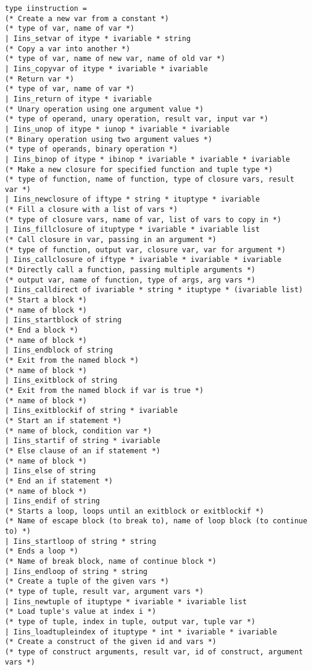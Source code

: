 \begin{verbatim}
type iinstruction =
(* Create a new var from a constant *)
(* type of var, name of var *)
| Iins_setvar of itype * ivariable * string
(* Copy a var into another *)
(* type of var, name of new var, name of old var *)
| Iins_copyvar of itype * ivariable * ivariable
(* Return var *)
(* type of var, name of var *)
| Iins_return of itype * ivariable
(* Unary operation using one argument value *)
(* type of operand, unary operation, result var, input var *)
| Iins_unop of itype * iunop * ivariable * ivariable
(* Binary operation using two argument values *)
(* type of operands, binary operation *)
| Iins_binop of itype * ibinop * ivariable * ivariable * ivariable
(* Make a new closure for specified function and tuple type *)
(* type of function, name of function, type of closure vars, result var *)
| Iins_newclosure of iftype * string * ituptype * ivariable
(* Fill a closure with a list of vars *)
(* type of closure vars, name of var, list of vars to copy in *)
| Iins_fillclosure of ituptype * ivariable * ivariable list
(* Call closure in var, passing in an argument *)
(* type of function, output var, closure var, var for argument *)
| Iins_callclosure of iftype * ivariable * ivariable * ivariable
(* Directly call a function, passing multiple arguments *)
(* output var, name of function, type of args, arg vars *)
| Iins_calldirect of ivariable * string * ituptype * (ivariable list)
(* Start a block *)
(* name of block *)
| Iins_startblock of string
(* End a block *)
(* name of block *)
| Iins_endblock of string
(* Exit from the named block *)
(* name of block *)
| Iins_exitblock of string
(* Exit from the named block if var is true *)
(* name of block *)
| Iins_exitblockif of string * ivariable
(* Start an if statement *)
(* name of block, condition var *)
| Iins_startif of string * ivariable
(* Else clause of an if statement *)
(* name of block *)
| Iins_else of string
(* End an if statement *)
(* name of block *)
| Iins_endif of string
(* Starts a loop, loops until an exitblock or exitblockif *)
(* Name of escape block (to break to), name of loop block (to continue to) *)
| Iins_startloop of string * string
(* Ends a loop *)
(* Name of break block, name of continue block *)
| Iins_endloop of string * string
(* Create a tuple of the given vars *)
(* type of tuple, result var, argument vars *)
| Iins_newtuple of ituptype * ivariable * ivariable list
(* Load tuple's value at index i *)
(* type of tuple, index in tuple, output var, tuple var *)
| Iins_loadtupleindex of ituptype * int * ivariable * ivariable
(* Create a construct of the given id and vars *)
(* type of construct arguments, result var, id of construct, argument vars *)

\end{verbatim}
